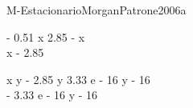 
\begin{bilevelmodel}{M-Estacionario}{MorganPatrone2006a}
    \begin{upperlevel}{- 0.51 x}{
         2.85 - x  \\ 
 x - 2.85 
    }
    \end{upperlevel}
    \begin{lowerlevel}{x y - 2.85 y}{
         3.33 e - 16 y - 16  \\ 
 - 3.33 e - 16 y - 16 
    }
    \end{lowerlevel}
\end{bilevelmodel}
    
        
